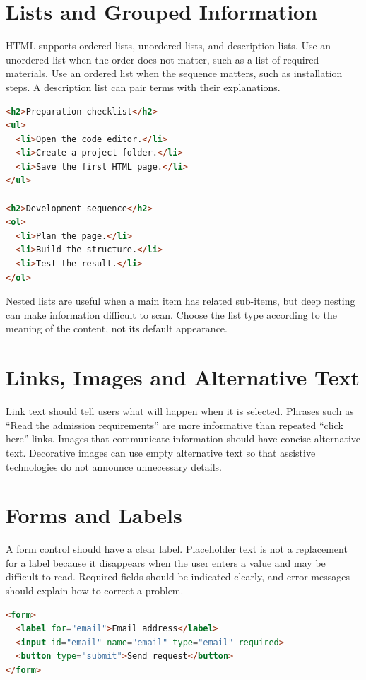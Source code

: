 \documentclass[11pt,openany,oneside]{book}
\begin{document}
\section{Lists and Grouped Information}
HTML supports ordered lists, unordered lists, and description lists. Use an unordered list when the order does not matter, such as a list of required materials. Use an ordered list when the sequence matters, such as installation steps. A description list can pair terms with their explanations.

\begin{lstlisting}[style=webcode,language=HTML]
<h2>Preparation checklist</h2>
<ul>
  <li>Open the code editor.</li>
  <li>Create a project folder.</li>
  <li>Save the first HTML page.</li>
</ul>

<h2>Development sequence</h2>
<ol>
  <li>Plan the page.</li>
  <li>Build the structure.</li>
  <li>Test the result.</li>
</ol>
\end{lstlisting}
Nested lists are useful when a main item has related sub-items, but deep nesting can make information difficult to scan. Choose the list type according to the meaning of the content, not its default appearance.

\section{Links, Images and Alternative Text}
Link text should tell users what will happen when it is selected. Phrases such as “Read the admission requirements” are more informative than repeated “click here” links. Images that communicate information should have concise alternative text. Decorative images can use empty alternative text so that assistive technologies do not announce unnecessary details.

\section{Forms and Labels}
A form control should have a clear label. Placeholder text is not a replacement for a label because it disappears when the user enters a value and may be difficult to read. Required fields should be indicated clearly, and error messages should explain how to correct a problem.

\begin{lstlisting}[style=webcode,language=HTML]
<form>
  <label for="email">Email address</label>
  <input id="email" name="email" type="email" required>
  <button type="submit">Send request</button>
</form>
\end{lstlisting}
\end{document}
